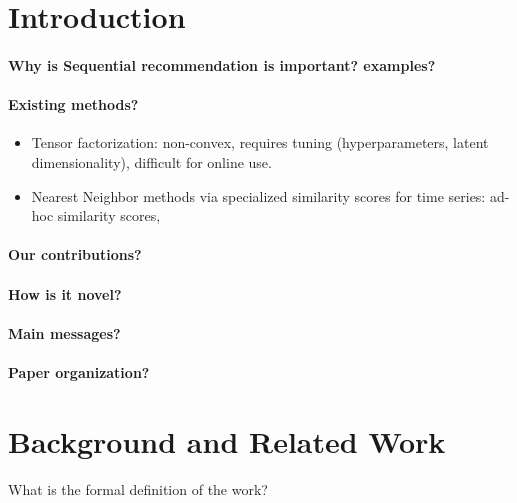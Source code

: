 \documentclass{sig-alternate-05-2015}
\begin{document}
%
%
\printccsdesc



\section{Introduction}
\paragraph{Why is Sequential recommendation is important? examples?}


\paragraph{Existing methods?} 
\begin{itemize}
\item Tensor factorization: non-convex, requires tuning (hyperparameters, latent dimensionality), difficult for online use.
\item Nearest Neighbor methods via specialized similarity scores for time series: ad-hoc similarity scores, 
\end{itemize}

\paragraph{Our contributions?}


\paragraph{How is it novel?} 

\paragraph{Main messages?}

\paragraph{Paper organization?}


\section{Background and Related Work}
What is the formal definition of the work?
\end{document}
